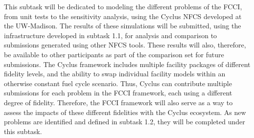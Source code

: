 This subtask will be dedicated to modeling the different problems of the
\gls{FCCI}, from unit tests to the sensitivity analysis, using the Cyclus
\gls{NFCS}\cite{CYCLUS} developed at the UW-Madison. The results of these simulations
will be submitted, using the infrastructure developed in subtask 1.1, for
analysis and comparison to submissions generated using other \gls{NFCS}
tools. These results will also, therefore, be available to other participants
as part of the comparison set for future submissions. The Cyclus framework
includes multiple facility packages of different fidelity levels, and the
ability to swap individual facility models within an otherwise constant fuel
cycle scenario. Thus, Cyclus can contribute multiple submissions for each
problem in the \gls{FCCI} framework, each using a different degree of
fidelity. Therefore, the \gls{FCCI} framework will also serve as a way to
assess the impacts of these different fidelities with the Cyclus ecosystem. As
new problems are identified and defined in subtask 1.2, they will be completed
under this subtask.


